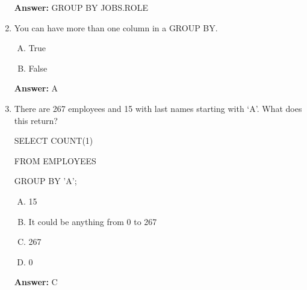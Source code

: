 \documentclass[12pt]{article}
\begin{document}
\begin{enumerate}[1.]
    \bigskip

    \textbf{Answer:} GROUP BY JOBS.ROLE


    \item

    You can have more than one column in a GROUP BY.

    \bigskip

    \begin{enumerate}[A.]
        \item True
        \item False
    \end{enumerate}

    \bigskip

    \textbf{Answer:} A

    \item

    There are 267 employees and 15 with last names starting with `A'. What does
    this return?

    \bigskip

    SELECT COUNT(1)

    FROM EMPLOYEES

    GROUP BY 'A';

    \bigskip

    \begin{enumerate}[A.]
        \item 15
        \item It could be anything from 0 to 267
        \item 267
        \item 0
    \end{enumerate}

    \bigskip

    \textbf{Answer:} C

\end{enumerate}
\end{document}
